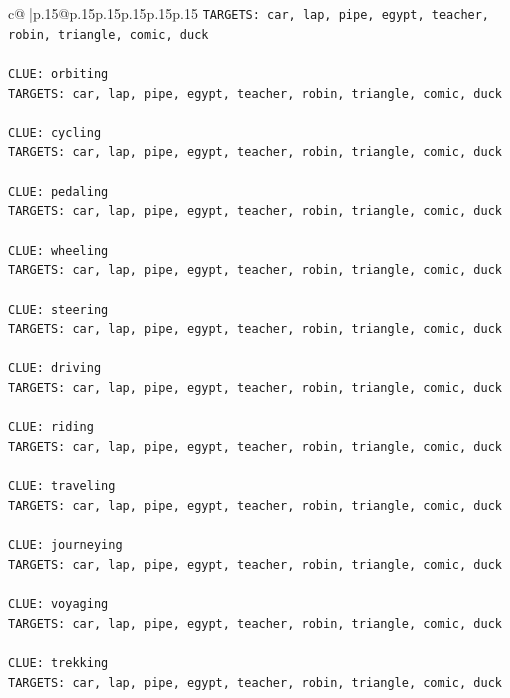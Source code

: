 \documentclass{article}
\begin{document}
{\begin{supertabular}{c@{$\;$}|p{.15\linewidth}@{}p{.15\linewidth}p{.15\linewidth}p{.15\linewidth}p{.15\linewidth}p{.15\linewidth}}
{{{\texttt{TARGETS: car, lap, pipe, egypt, teacher, robin, triangle, comic, duck} \\
\\ 
\texttt{CLUE: orbiting} \\
\texttt{TARGETS: car, lap, pipe, egypt, teacher, robin, triangle, comic, duck} \\
\\ 
\texttt{CLUE: cycling} \\
\texttt{TARGETS: car, lap, pipe, egypt, teacher, robin, triangle, comic, duck} \\
\\ 
\texttt{CLUE: pedaling} \\
\texttt{TARGETS: car, lap, pipe, egypt, teacher, robin, triangle, comic, duck} \\
\\ 
\texttt{CLUE: wheeling} \\
\texttt{TARGETS: car, lap, pipe, egypt, teacher, robin, triangle, comic, duck} \\
\\ 
\texttt{CLUE: steering} \\
\texttt{TARGETS: car, lap, pipe, egypt, teacher, robin, triangle, comic, duck} \\
\\ 
\texttt{CLUE: driving} \\
\texttt{TARGETS: car, lap, pipe, egypt, teacher, robin, triangle, comic, duck} \\
\\ 
\texttt{CLUE: riding} \\
\texttt{TARGETS: car, lap, pipe, egypt, teacher, robin, triangle, comic, duck} \\
\\ 
\texttt{CLUE: traveling} \\
\texttt{TARGETS: car, lap, pipe, egypt, teacher, robin, triangle, comic, duck} \\
\\ 
\texttt{CLUE: journeying} \\
\texttt{TARGETS: car, lap, pipe, egypt, teacher, robin, triangle, comic, duck} \\
\\ 
\texttt{CLUE: voyaging} \\
\texttt{TARGETS: car, lap, pipe, egypt, teacher, robin, triangle, comic, duck} \\
\\ 
\texttt{CLUE: trekking} \\
\texttt{TARGETS: car, lap, pipe, egypt, teacher, robin, triangle, comic, duck} \\
}}}
\end{supertabular}}
\end{document}
